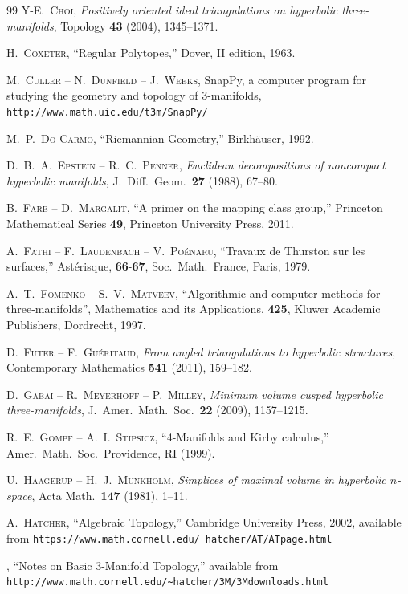\begin{thebibliography}{99}
 \textsc{Y-E.~Choi}, \emph{Positively oriented ideal triangulations on hyperbolic three-manifolds}, Topology \textbf{43} (2004), 1345--1371.

 \textsc{H.~Coxeter}, ``Regular Polytopes,'' Dover, II edition, 1963.

 \textsc{M.~Culler -- N.~Dunfield -- J.~Weeks}, SnapPy, a computer
program for studying the geometry and topology of 3-manifolds, {\tt 
http://www.math.uic.edu/t3m/SnapPy/}

 \textsc{M.~P.~Do Carmo}, ``Riemannian Geometry,'' Birkh\"auser, 1992. 

 \textsc{D.~B.~A.~Epstein -- R.~C.~Penner}, \emph{Euclidean decompositions of noncompact hyperbolic manifolds}, J.~Diff.~Geom.~\textbf{27} (1988), 67--80.

 \textsc{B.~Farb -- D.~Margalit}, ``A primer on the mapping class group,''
Princeton Mathematical Series \textbf{49}, Princeton University Press, 2011.

 \textsc{A.~Fathi -- F.~Laudenbach -- V.~Po\'enaru}, ``Travaux de Thurston sur les surfaces,'' Ast\'erisque, \textbf{66}-\textbf{67}, Soc.~Math.~France, Paris, 1979.

 \textsc{A.~T.~Fomenko -- S.~V.~Matveev}, ``Algorithmic and computer methods for three-manifolds'', Mathematics and its Applications, \textbf{425}, Kluwer Academic Publishers, Dordrecht, 1997.

 \textsc{D.~Futer -- F.~Gu\'eritaud}, \emph{From angled triangulations to hyperbolic structures}, Contemporary Mathematics \textbf{541} (2011), 159--182. 

 \textsc{D.~Gabai -- R.~Meyerhoff -- P.~Milley}, \emph{Minimum volume cusped hyperbolic three-manifolds}, J.~Amer.~Math.~Soc.~\textbf{22} (2009), 1157--1215.

 \textsc{R.~E.~Gompf -- A.~I.~Stipsicz}, ``4-Manifolds and Kirby calculus,'' Amer.~Math.~Soc.~Providence, RI (1999).

 \textsc{U.~Haagerup -- H.~J.~Munkholm}, \emph{Simplices of maximal volume in hyperbolic $n$-space}, Acta Math.~\textbf{147} (1981), 1--11.

 \textsc{A.~Hatcher}, ``Algebraic Topology,'' Cambridge University Press, 2002, available from {\tt https://www.math.cornell.edu/~hatcher/AT/ATpage.html}

 \bysame, ``Notes on Basic 3-Manifold Topology,'' available from {\tt http://www.math.cornell.edu/\textasciitilde hatcher/3M/3Mdownloads.html}


\end{thebibliography}
